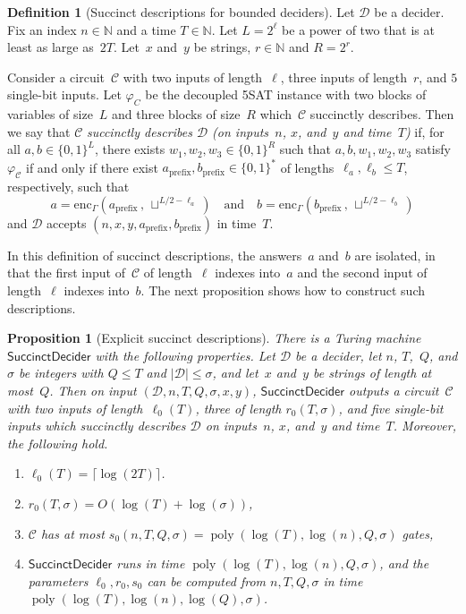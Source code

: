 \documentclass[11pt]{article}
\newtheorem{proposition}[theorem]{Proposition}
\theoremstyle{definition}
\newtheorem{definition}[theorem]{Definition}
\newcommand{\N}{\ensuremath{\mathbb{N}}}
\DeclareMathOperator{\poly}{poly}
\newcommand{\decider}{\mathcal{D}}
\newcommand{\succinctdecider}{\ensuremath{\mathsf{SuccinctDecider}}}
\newcommand{\circuit}{\mathcal{C}}
\newcommand{\qlen}{Q}
\begin{document}
\begin{definition}[Succinct descriptions for bounded deciders]
  Let $\decider$ be a decider.
  Fix an index $n \in \N$ and a time $T \in \N$.
  Let $L = 2^\ell$ be a power of two that is at least as large as~$2T$.
  Let~$x$ and~$y$ be strings, $r\in\N$ and $R=2^r$.

  Consider a circuit~$\circuit$ with two inputs of length~$\ell$, three inputs
  of length~$r$, and $5$ single-bit inputs.
  Let $\varphi_C$ be the decoupled 5SAT instance with two blocks of variables of
  size~$L$ and three blocks of size~$R$ which~$\circuit$ succinctly describes.
  Then we say that $\circuit$ \emph{succinctly describes $\decider$ (on
    inputs~$n$, $x$, and~$y$ and time~$T$)} if, for all $a, b \in \{0, 1\}^{L}$,
  there exists $w_1, w_2, w_3 \in \{0, 1\}^{R}$ such that $a, b, w_1, w_2, w_3$
  satisfy $\varphi_{\circuit}$ if and only if there exist $a_{\mathrm{prefix}},
  b_{\mathrm{prefix}} \in \{0, 1\}^*$ of lengths~$\ell_a, \ell_b \leq T$,
  respectively, such that
  \begin{equation*}
    a = \mathrm{enc}_\Gamma(a_{\mathrm{prefix}}\,,\, \sqcup^{L/2 - \ell_a})
  \quad
  \text{and}
  \quad
  b = \mathrm{enc}_\Gamma(b_{\mathrm{prefix}}\,,\, \sqcup^{L/2 - \ell_b})
  \end{equation*}
  and $\decider$ accepts $(n, x, y, a_{\mathrm{prefix}}, b_{\mathrm{prefix}})$
  in time~$T$.
\end{definition}

In this definition of succinct descriptions, the answers~$a$ and~$b$ are
isolated, in that the first input of~$\circuit$ of length~$\ell$ indexes
into~$a$ and the second input of length~$\ell$ indexes into~$b$.
The next proposition shows how to construct such descriptions.

\begin{proposition}[Explicit succinct descriptions]
  \label{prop:explicit-succinct-deciders}
  There is a Turing machine $\succinctdecider$ with the following properties.
  Let $\decider$ be a decider, let $n$, $T$,~$\qlen$, and $\sigma$ be integers
  with $\qlen \leq T$ and $|\decider| \leq \sigma$, and let~$x$ and~$y$ be
  strings of length at most~$\qlen$.
  Then on input $(\decider, n, T, \qlen, \sigma, x, y)$, $\succinctdecider$
  outputs a circuit~$\circuit$ with two inputs of length~$\ell_0(T)$, three of
  length $r_0(T, \sigma)$, and five single-bit inputs which succinctly
  describes $\decider$ on inputs~$n$, $x$, and~$y$ and time~$T$.
  Moreover, the following hold.
  \begin{enumerate}
  \item $\ell_0(T) = \lceil \log(2T) \rceil$.
  \item $r_0(T,\sigma) = O(\log(T)+\log(\sigma))$,
  \item $\circuit$ has at most $s_0(n,T,\qlen,\sigma) = \poly(\log(T), \log(n),
    \qlen,\sigma)$ gates,
  \item $\succinctdecider$ runs in time $\poly(\log(T), \log(n),
    \qlen,\sigma)$, and the parameters $\ell_0, r_0, s_0$ can be computed
    from $n, T, \qlen,\sigma$ in time $\poly(\log(T), \log(n),
    \log(\qlen),\sigma)$.
  \end{enumerate}
\end{proposition}
\end{document}
